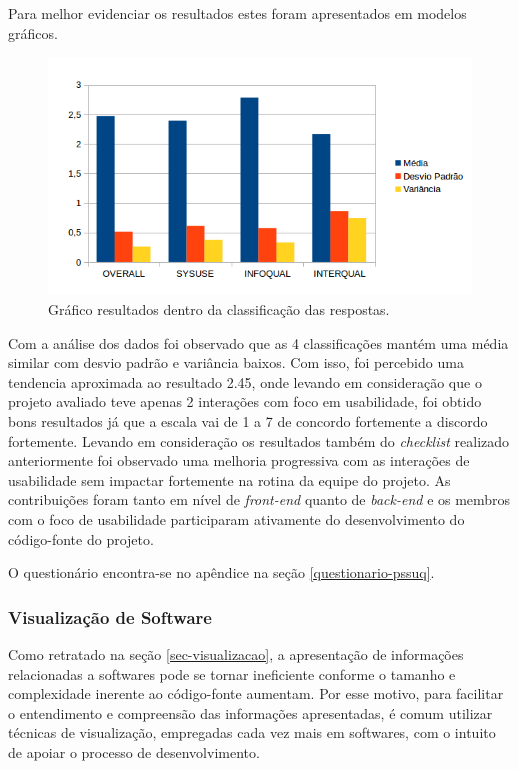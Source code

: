 Para melhor evidenciar os resultados estes foram apresentados em modelos gráficos.

\graphicspath{{figuras/}}
\begin{figure}[h]
\centering
\includegraphics[width=1.0\textwidth]{GraficoResultados}
\caption{Gráfico resultados dentro da classificação das respostas.}
\label{parallel-coordinate}
\end{figure}

Com a análise dos dados foi observado que as 4 classificações mantém uma média similar com desvio padrão e variância baixos. Com isso, foi percebido uma tendencia aproximada ao resultado 2.45, onde levando em consideração que o projeto avaliado teve apenas 2 interações com foco em usabilidade, foi obtido bons resultados já que a escala vai de 1 a 7 de concordo fortemente a discordo fortemente. Levando em consideração os resultados também do \textit{checklist} realizado anteriormente foi observado uma melhoria progressiva com as interações de usabilidade sem impactar fortemente na rotina da equipe do projeto. As contribuições foram tanto em nível de \textit{front-end} quanto de \textit{back-end} e os membros com o foco de usabilidade participaram ativamente do desenvolvimento do código-fonte do projeto. 

O questionário encontra-se no apêndice na seção \ref{questionario-pssuq}.

%
\subsubsection{Visualização de Software}
\label{visualizacao-software}

Como retratado na seção \ref{sec-visualizacao}, a apresentação de informações relacionadas a softwares pode se tornar ineficiente conforme o tamanho e complexidade inerente ao código-fonte aumentam. Por esse motivo, para facilitar o entendimento e compreensão das informações apresentadas, é comum utilizar técnicas de visualização, empregadas cada vez mais em softwares, com o intuito de apoiar o processo de desenvolvimento.

